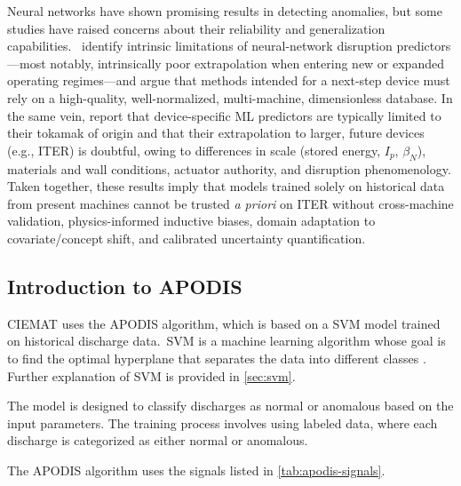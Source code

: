 Neural networks have shown promising results in detecting anomalies, but some studies have raised concerns about their reliability and generalization capabilities.\ \textcite[p.~S188]{henderChapter3MHD2007} identify intrinsic limitations of neural-network disruption predictors—most notably, intrinsically poor extrapolation when entering new or expanded operating regimes—and argue that methods intended for a next-step device must rely on a high-quality, well-normalized, multi-machine, dimensionless database. In the same vein, \textcite[p.~2]{murariControlOrientedStrategy2024} report that device-specific ML predictors are typically limited to their tokamak of origin and that their extrapolation to larger, future devices (e.g., \ac{ITER}) is doubtful, owing to differences in scale (stored energy, $I_p$, $\beta_N$), materials and wall conditions, actuator authority, and disruption phenomenology. Taken together, these results imply that models trained solely on historical data from present machines cannot be trusted \emph{a priori} on ITER without cross-machine validation, physics-informed inductive biases, domain adaptation to covariate/concept shift, and calibrated uncertainty quantification.



\subsection{Introduction to \acs{APODIS}}

\ac{CIEMAT} uses the \ac{APODIS} algorithm, which is based on a \ac{SVM} model trained on historical discharge data.\ \ac{SVM} is a machine learning algorithm whose goal is to find the optimal hyperplane that separates the data into different classes \autocite{6524743}. Further explanation of \ac{SVM} is provided in \autoref{sec:svm}.

The model is designed to classify discharges as normal or anomalous based on the input parameters. The training process involves using labeled data, where each discharge is categorized as either normal or anomalous.

The \ac{APODIS} algorithm uses the signals listed in \autoref{tab:apodis-signals}.

